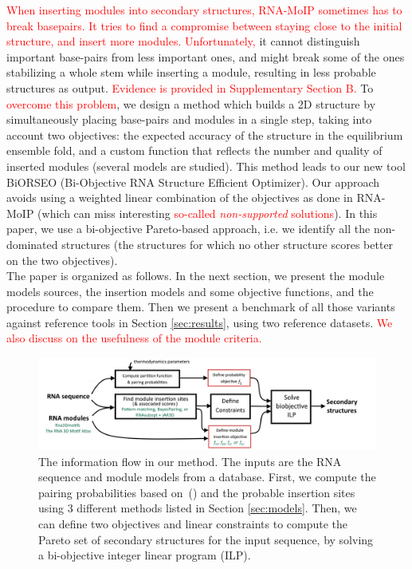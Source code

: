 \documentclass{bioinfo}
\begin{document}
\textcolor{red}{When inserting modules into secondary structures, RNA-MoIP sometimes has to break basepairs. 
It tries to find a compromise between staying close to the initial structure, and insert more modules. Unfortunately, }it cannot distinguish important base-pairs from less important ones, and might break some of the ones stabilizing a whole stem while inserting a module, resulting in less probable structures as output. \textcolor{red}{Evidence is provided in Supplementary Section B.}
To \textcolor{red}{overcome this problem}, we design a method which builds a 2D structure by simultaneously placing base-pairs and modules in a single step, taking into account two objectives: the expected accuracy of the structure in the equilibrium ensemble fold, and a custom function that reflects the number and quality of inserted modules (several models are studied). 
This method leads to our new tool BiORSEO (Bi-Objective RNA Structure Efficient Optimizer). 
Our approach avoids using a weighted linear combination of the objectives as done in RNA-MoIP (which can miss interesting \textcolor{red}{so-called \textit{non-supported} solutions}). In this paper, we use a bi-objective Pareto-based approach, i.e. we identify all the non-dominated structures (the structures for which no other structure scores better on the two objectives).\\

The paper is organized as follows. In the next section, we present the module models sources, the insertion models and some objective functions, and the procedure to compare them. Then we present a benchmark of all those variants against reference tools in Section \ref{sec:results}, using two reference datasets. \textcolor{red}{We also discuss on the usefulness of the module criteria.}

\begin{figure}[t]
   \includegraphics[width=\textwidth]{graph_abstract.jpg} 
   \caption{The information flow in our method. The inputs are the RNA sequence and module models from a database. First, we compute the pairing probabilities based on~(\citealp{dirksAlgorithmComputingNucleic2004}) and the probable insertion sites using 3 different methods listed in Section \ref{sec:models}. Then, we can define two objectives and linear constraints to compute the Pareto set of secondary structures for the input sequence, by solving a bi-objective integer linear program (ILP).}
   \label{fig:pipeline}
\end{figure}
\end{document}
